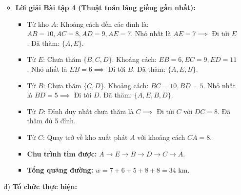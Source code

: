 \documentclass[12pt, a4paper]{article}
\begin{document}
\begin{itemize}[leftmargin=1.2cm]
    \begin{itemize}[leftmargin=0.6cm]
        \item \textbf{Lời giải Bài tập 4 (Thuật toán láng giềng gần nhất):}
        \begin{itemize}
            \item Từ kho $A$: Khoảng cách đến các đỉnh là: $AB=10, AC=8, AD=9, AE=7$. Nhỏ nhất là $AE = 7 \implies$ Đi tới $E$. Đã thăm: $\{A, E\}$.
            \item Từ $E$: Chưa thăm $\{B, C, D\}$. Khoảng cách: $EB=6, EC=9, ED=11$. Nhỏ nhất là $EB = 6 \implies$ Đi tới $B$. Đã thăm: $\{A, E, B\}$.
            \item Từ $B$: Chưa thăm $\{C, D\}$. Khoảng cách: $BC=10, BD=5$. Nhỏ nhất là $BD = 5 \implies$ Đi tới $D$. Đã thăm: $\{A, E, B, D\}$.
            \item Từ $D$: Đỉnh duy nhất chưa thăm là $C \implies$ Đi tới $C$ với $DC = 8$. Đã thăm đủ 5 đỉnh.
            \item Từ $C$: Quay trở về kho xuất phát $A$ với khoảng cách $CA = 8$.
            \item \textbf{Chu trình tìm được:} $A \to E \to B \to D \to C \to A$.
            \item \textbf{Tổng quãng đường:} $w = 7 + 6 + 5 + 8 + 8 = 34\text{ km}$.
        \end{itemize}
    \end{itemize}

    \item[d)] \textbf{Tổ chức thực hiện:}
\end{itemize}
\end{document}
